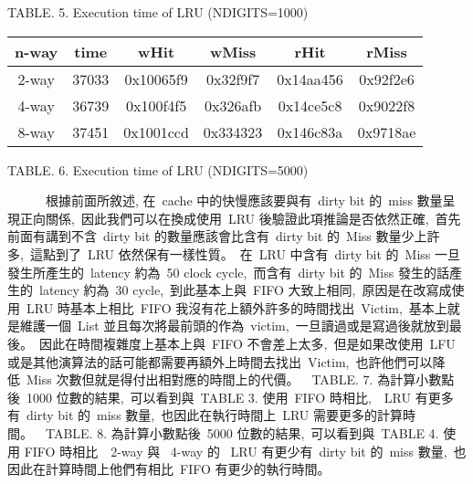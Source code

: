 \documentclass{article}
\begin{document}
\begin{CJK*}{UTF8}{bsmi}
\begin{multicols}{2}
\begin{center}
    \footnotesize TABLE. 5. Execution time of LRU (NDIGITS=1000)
\end{center}

\begin{center}
    \begin{tabular}{||c c c c c c ||} 
        \hline
        n-way & time & wHit & wMiss & rHit & rMiss \\ [1.0ex] 
        \hline\hline
        2-way & 37033 & 0x10065f9 & 0x32f9f7 & 0x14aa456 & 0x92f2e6  \\ 
        \hline
        4-way & 36739 & 0x100f4f5 & 0x326afb & 0x14ce5c8 & 0x9022f8  \\ 
        \hline
        8-way & 37451 & 0x1001ccd & 0x334323 & 0x146c83a & 0x9718ae \\
        \hline
    \end{tabular}
\end{center}

\begin{center}
    \footnotesize TABLE. 6. Execution time of LRU (NDIGITS=5000)
\end{center}

\begin{flushleft}
    \ \ \ \ \ \ 根據前面所敘述, 在\ cache 中的快慢應該要與有\ dirty bit 的\ miss 數量呈現正向關係,\
    因此我們可以在換成使用\ LRU 後驗證此項推論是否依然正確,\
    首先前面有講到不含\ dirty bit 的數量應該會比含有\ dirty bit 的\ Miss 數量少上許多,\
    這點到了\ LRU 依然保有一樣性質。\
    在\ LRU 中含有\ dirty bit 的\ Miss 一旦發生所產生的\ latency 約為\ 50 clock cycle,\
    而含有\ dirty bit 的\ Miss 發生的話產生的\ latency 約為\ 30 cycle,\
    到此基本上與\ FIFO 大致上相同,\
    原因是在改寫成使用\ LRU 時基本上相比\ FIFO 我沒有花上額外許多的時間找出\ Victim,\
    基本上就是維護一個\ List 並且每次將最前頭的作為\ victim,\
    一旦讀過或是寫過後就放到最後。\
    因此在時間複雜度上基本上與\ FIFO 不會差上太多,\
    但是如果改使用\ LFU 或是其他演算法的話可能都需要再額外上時間去找出\ Victim,\
    也許他們可以降低\ Miss 次數但就是得付出相對應的時間上的代價。\
    \ TABLE. 7. 為計算小數點後\ 1000 位數的結果,\
    可以看到與\ TABLE 3. 使用\ FIFO 時相比,\
    \ LRU 有更多有\ dirty bit 的\ miss 數量,\
    也因此在執行時間上\ LRU 需要更多的計算時間。\
    \ TABLE. 8. 為計算小數點後\ 5000 位數的結果,\
    可以看到與\ TABLE 4. 使用 FIFO 時相比\,
    \ 2-way 與 \ 4-way 的 \ LRU 有更少有\ dirty bit 的\ miss 數量,\
    也因此在計算時間上他們有相比\ FIFO 有更少的執行時間。\
\end{flushleft}


\end{multicols}
\end{CJK*}
\end{document}
